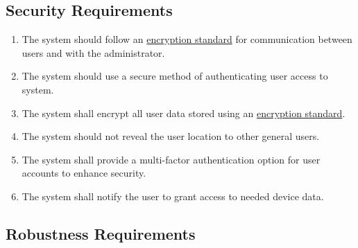 \documentclass{article}
\begin{document}
\subsection{Security Requirements}

\begin{enumerate}[label=\textbf{SER-\arabic*},ref=SER-\arabic*]
    \item \label{SER-1} The system should follow an \hyperref[ssub:def]{encryption standard} for communication between users and with the administrator. \\
    \item \label{SER-2} The system should use a secure method of authenticating user access to system. \\
    \item \label{SER-3} The system shall encrypt all user data stored using an \hyperref[ssub:def]{encryption standard}. \\
    \item \label{SER-4} The system should not reveal the user location to other general users. \\
    \item \label{SER-5} The system shall provide a multi-factor authentication option for user accounts to enhance security. \\
    \item \label{SER-6} The system shall notify the user to grant access to needed device data. \\
\end{enumerate}

\subsection{Robustness Requirements}
\end{document}
